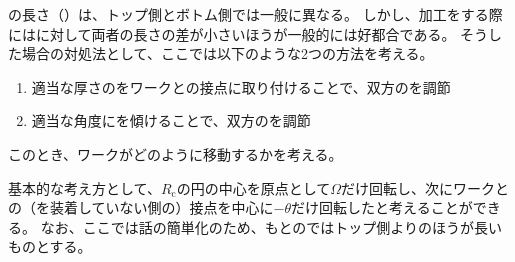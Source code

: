 

\Alocation の長さ（\textbf{\AlocationLength}）は、トップ側とボトム側では一般に異なる。
しかし、加工をする際には\JigCenter に対して両者の長さの差が小さいほうが一般的には好都合である。
そうした場合の対処法として、ここでは以下のような2つの方法を考える。
\begin{enumerate}
\item
適当な厚さの\textbf{\Spacer}をワークと\nameJig の接点に取り付けることで、双方の\AlocationLength を調節
\item
適当な角度に\Table を傾けることで、双方の\AlocationLength を調節
\end{enumerate}
このとき、ワークがどのように移動するかを考える。

基本的な考え方として、\textbf{\CenterCurvatureRadius}$R_\mathrm c$の円の中心を原点として$\Omega$だけ回転し、次にワークとの（\Spacer を装着していない側の）接点を中心に$-\theta$だけ回転したと考えることができる。
なお、ここでは話の簡単化のため、もとの\Alocation ではトップ側より\BottomAlocationLength のほうが長いものとする。




